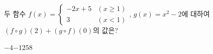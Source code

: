 두 함수 $f(x)=\begin{cases} -2x+5 & (x\ge 1) \\ 3 & (x<1) \end{cases}$, $g(x)=x^2-2$에 대하여 $(f\circ g)(2)+(g\circ f)(0)$의 값은?
\begin{choices32}{$-4$}{$-1$}{$2$}{$5$}{$8$}\end{choices32}
